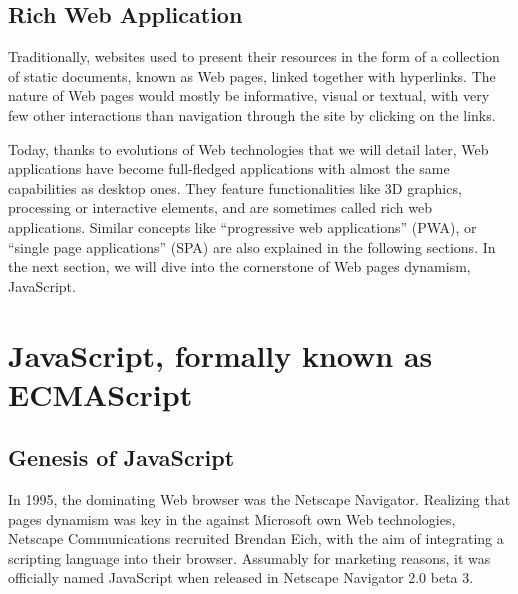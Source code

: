 



\subsection{Rich Web Application}%
\label{sub:rich_web_application}

Traditionally, websites used to present their resources in the form of a collection
of static documents, known as Web pages, linked together with hyperlinks.
The nature of Web pages would mostly be informative, visual or textual,
with very few other interactions than navigation through the site by
clicking on the links.

Today, thanks to evolutions of Web technologies that we will detail later,
Web applications have become full-fledged applications with almost
the same capabilities as desktop ones.
They feature functionalities like 3D graphics,  processing or interactive elements,
and are sometimes called rich web applications.
Similar concepts like ``progressive web applications'' (PWA),
or ``single page applications'' (SPA) are also explained in the following sections.
In the next section, we will dive into the cornerstone of Web pages dynamism, JavaScript.


\section{JavaScript, formally known as ECMAScript}%
\label{sec:javascript_formally_known_as_ecmascript}

\subsection{Genesis of JavaScript}%
\label{sub:genesis_of_javascript}

In 1995, the dominating Web browser was the Netscape Navigator.
Realizing that pages dynamism was key in the  against Microsoft
own Web technologies, Netscape Communications recruited Brendan Eich,
with the aim of integrating a scripting language into their browser.
Assumably for marketing reasons, it was officially named JavaScript
when released in Netscape Navigator 2.0 beta 3.

